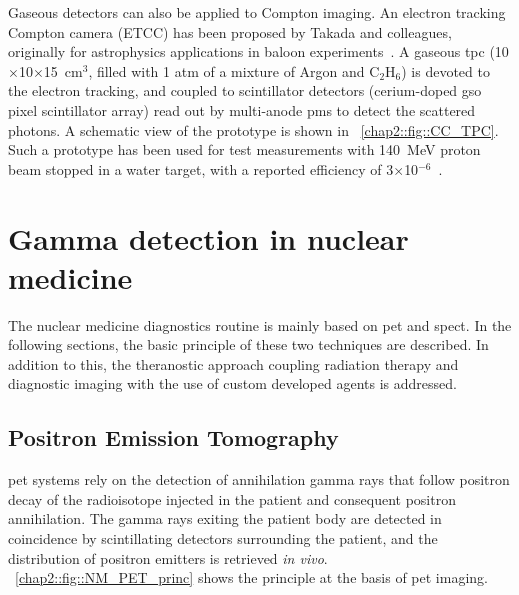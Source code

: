 Gaseous detectors can also be applied to Compton imaging. An electron tracking Compton camera (ETCC) has been proposed by Takada and colleagues, originally for astrophysics applications in baloon experiments~\parencite{Takada2011}. A gaseous \gls{tpc} (10$\times$10$\times$15~cm$^3$, filled with 1 atm of a mixture of Argon and C$_2$H$_6$) is devoted to the electron tracking, and coupled to scintillator detectors (cerium-doped \gls{gso} pixel scintillator array) read out by multi-anode \glspl{pm} to detect the scattered photons. A schematic view of the prototype is shown in \figurename~\ref{chap2::fig::CC_TPC}. Such a prototype has been used for test measurements with 140~MeV proton beam stopped in a water target, with a reported efficiency of 3$\times$10$^{-6}$~\parencite{Kurosawa2012}. 

\section{Gamma detection in nuclear medicine}\label{chap2::sec::GammaNM}

The nuclear medicine diagnostics routine is mainly based on \gls{pet} and \gls{spect}. In the following sections, the basic principle of these two techniques are described. In addition to this, the theranostic approach coupling radiation therapy and diagnostic imaging with the use of custom developed agents is addressed. 

\subsection{Positron Emission Tomography}\label{chap2::subsec::PET_NM}

\gls{pet} systems rely on the detection of annihilation gamma rays that follow positron decay of the radioisotope injected in the patient and consequent positron annihilation. The gamma rays exiting the patient body are detected in coincidence by scintillating detectors surrounding the patient, and the distribution of positron emitters is retrieved \textit{in vivo}. 
\figurename~\ref{chap2::fig::NM_PET_princ} shows the principle at the basis of \gls{pet} imaging. 

